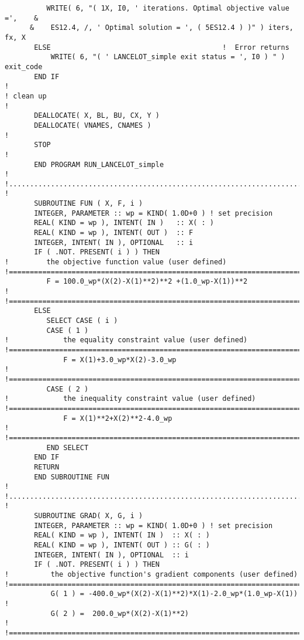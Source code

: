 \documentclass{galahad}
\begin{document}
{\begin{verbatim}
          WRITE( 6, "( 1X, I0, ' iterations. Optimal objective value =',    &
      &    ES12.4, /, ' Optimal solution = ', ( 5ES12.4 ) )" ) iters, fx, X
       ELSE                                         !  Error returns
           WRITE( 6, "( ' LANCELOT_simple exit status = ', I0 ) " ) exit_code
       END IF
!
! clean up
!
       DEALLOCATE( X, BL, BU, CX, Y )
       DEALLOCATE( VNAMES, CNAMES )
!
       STOP
!
       END PROGRAM RUN_LANCELOT_simple
!
!.............................................................................
!
       SUBROUTINE FUN ( X, F, i )
       INTEGER, PARAMETER :: wp = KIND( 1.0D+0 ) ! set precision
       REAL( KIND = wp ), INTENT( IN )   :: X( : )
       REAL( KIND = wp ), INTENT( OUT )  :: F
       INTEGER, INTENT( IN ), OPTIONAL   :: i
       IF ( .NOT. PRESENT( i ) ) THEN
!         the objective function value (user defined)
!==============================================================================
          F = 100.0_wp*(X(2)-X(1)**2)**2 +(1.0_wp-X(1))**2                    !
!==============================================================================
       ELSE
          SELECT CASE ( i )
          CASE ( 1 )
!             the equality constraint value (user defined)
!==============================================================================
              F = X(1)+3.0_wp*X(2)-3.0_wp                                     !
!==============================================================================
          CASE ( 2 )
!             the inequality constraint value (user defined)
!==============================================================================
              F = X(1)**2+X(2)**2-4.0_wp                                      !
!==============================================================================
          END SELECT
       END IF
       RETURN
       END SUBROUTINE FUN
!
!.............................................................................
!
       SUBROUTINE GRAD( X, G, i )
       INTEGER, PARAMETER :: wp = KIND( 1.0D+0 ) ! set precision
       REAL( KIND = wp ), INTENT( IN )  :: X( : )
       REAL( KIND = wp ), INTENT( OUT ) :: G( : )
       INTEGER, INTENT( IN ), OPTIONAL  :: i
       IF ( .NOT. PRESENT( i ) ) THEN
!          the objective function's gradient components (user defined)
!==============================================================================
           G( 1 ) = -400.0_wp*(X(2)-X(1)**2)*X(1)-2.0_wp*(1.0_wp-X(1))        !
           G( 2 ) =  200.0_wp*(X(2)-X(1)**2)                                  !
!==============================================================================

\end{verbatim}}
\end{document}
